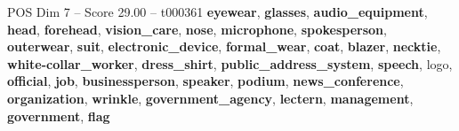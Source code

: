 \begin{textsample}{POS Dim 7 – Score 29.00 – t000361}  \label{ex:f7_pos_006}
\textbf{eyewear}, \textbf{glasses}, \textbf{audio\_equipment}, \textbf{head}, \textbf{forehead}, \textbf{vision\_care}, \textbf{nose}, \textbf{microphone}, \textbf{spokesperson}, \textbf{outerwear}, \textbf{suit}, \textbf{electronic\_device}, \textbf{formal\_wear}, \textbf{coat}, \textbf{blazer}, \textbf{necktie}, \textbf{white-collar\_worker}, \textbf{dress\_shirt}, \textbf{public\_address\_system}, \textbf{speech}, logo, \textbf{official}, \textbf{job}, \textbf{businessperson}, \textbf{speaker}, \textbf{podium}, \textbf{news\_conference}, \textbf{organization}, \textbf{wrinkle}, \textbf{government\_agency}, \textbf{lectern}, \textbf{management}, \textbf{government}, \textbf{flag}

\end{textsample}
